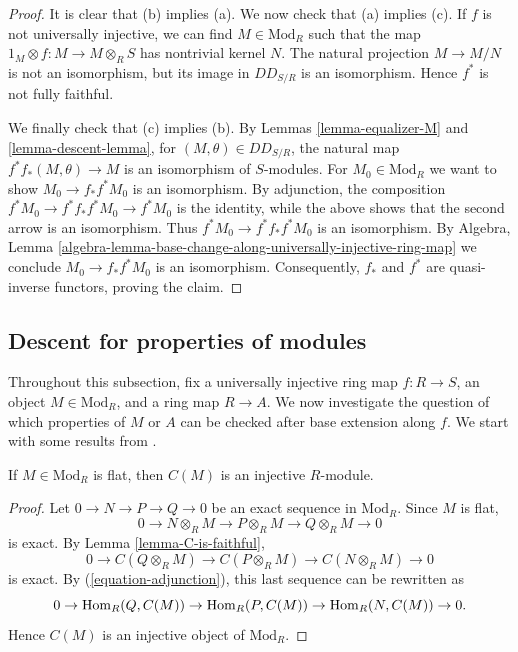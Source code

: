 \begin{proof}
It is clear that (b) implies (a). We now check that (a) implies (c). If $f$ is 
not universally injective, we can find $M \in \text{Mod}_R$ such that the map
$1_M \otimes f: M \to M \otimes_R S$ has nontrivial kernel $N$.
The natural projection $M \to M/N$ is not an isomorphism, but its image in 
$DD_{S/R}$ is an isomorphism.
Hence $f^*$ is not fully faithful.

\medskip\noindent
We finally check that (c) implies (b). By Lemmas 
\ref{lemma-equalizer-M} and \ref{lemma-descent-lemma}, for
$(M, \theta) \in DD_{S/R}$,
the natural map $f^* f_*(M,\theta) \to M$ is an isomorphism of $S$-modules.
For $M_0 \in \text{Mod}_R$ we want to show $M_0 \to f_*f^*M_0$ is an
isomorphism. By adjunction, the composition
$f^*M_0 \to f^*f_*f^*M_0 \to f^*M_0$ is the identity, while the above
shows that the second arrow is an isomorphism. Thus
$f^*M_0 \to f^*f_*f^*M_0$ is an isomorphism. By Algebra, Lemma
\ref{algebra-lemma-base-change-along-universally-injective-ring-map}
we conclude $M_0 \to f_* f^* M_0$ is an isomorphism.
Consequently, $f_*$ and $f^*$ are  quasi-inverse functors, proving the claim.
\end{proof}

\subsection{Descent for properties of modules}
\label{subsection-descent-properties-modules}

\noindent
Throughout this subsection, fix a universally injective ring map $f : R \to S$,
an object $M \in \text{Mod}_R$, and a ring map $R \to A$. We now investigate
the question of which properties of $M$ or $A$ can be checked after base
extension along $f$. We start with some results from 
\cite{mesablishvili2}.

\begin{lemma}
\label{lemma-flat-to-injective}
If $M \in \text{Mod}_R$ is flat, then $C(M)$ is an injective $R$-module.
\end{lemma}

\begin{proof}
Let $0 \to N \to P \to Q \to 0$ be an exact sequence in $\text{Mod}_R$. Since 
$M$ is flat,
$$
0 \to N \otimes_R M \to P \otimes_R M \to Q \otimes_R M \to 0
$$
is exact.
By Lemma \ref{lemma-C-is-faithful},
$$
0 \to C(Q \otimes_R M) \to C(P \otimes_R M) \to C(N \otimes_R M) \to 0
$$
is exact. By (\ref{equation-adjunction}), this last sequence can be rewritten
as
$$
0 \to \mathop{\mathrm{Hom}}\nolimits_R(Q, C(M)) \to \mathop{\mathrm{Hom}}\nolimits_R(P, C(M)) \to \mathop{\mathrm{Hom}}\nolimits_R(N, C(M)) \to 0.
$$
Hence $C(M)$ is an injective object of $\text{Mod}_R$.
\end{proof}

